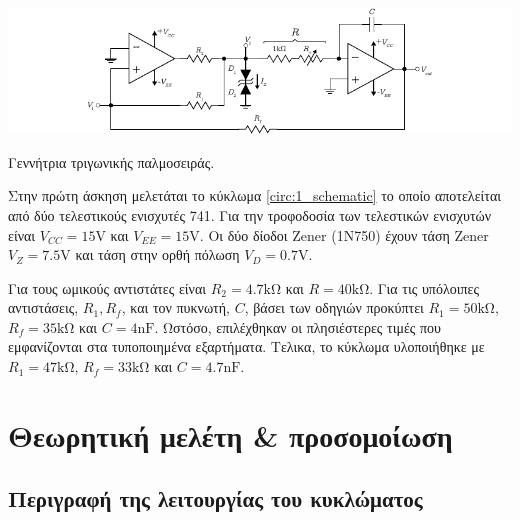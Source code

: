 \begin{center}
	\begin{circuitfig}[H]
		\includegraphics[width=14cm]{circuits/micro3_lab1.pdf}
		\caption{Γεννήτρια τριγωνικής παλμοσειράς.}
		\label{circ:1_schematic}
	\end{circuitfig}
\end{center}
\vspace*{-1cm}

Στην πρώτη άσκηση μελετάται το κύκλωμα \ref{circ:1_schematic} το οποίο αποτελείται από δύο τελεστικούς ενισχυτές 741. Για την τροφοδοσία των τελεστικών ενισχυτών είναι $V_{CC}=15\unit{\volt}$ και $V_{EE}=15\unit{\volt}$. Οι δύο δίοδοι Zener (1N750) έχουν τάση Zener $V_Z=7.5\unit{\volt}$ και τάση στην ορθή πόλωση $V_D=0.7\unit{\volt}$.\par
Για τους ωμικούς αντιστάτες είναι $R_2=4.7\unit{\kilo\ohm}$ και $R=40\unit{\kilo\ohm}$. Για τις υπόλοιπες αντιστάσεις, $R_1,R_f$, και τον πυκνωτή, $C$, βάσει των οδηγιών προκύπτει $R_1=50\unit{\kilo\ohm}$, $R_f=35\unit{\kilo\ohm}$ και $C=4\unit{\nano\farad}$. Ωστόσο, επιλέχθηκαν οι πλησιέστερες τιμές που εμφανίζονται στα τυποποιημένα εξαρτήματα. Τελικα, το κύκλωμα υλοποιήθηκε με $R_1=47\unit{\kilo\ohm}$, $R_f=33\unit{\kilo\ohm}$ και $C=4.7\unit{\nano\farad}$.\par

\section{Θεωρητική μελέτη \& προσομοίωση}

	\subsection{Περιγραφή της λειτουργίας του κυκλώματος}
		



